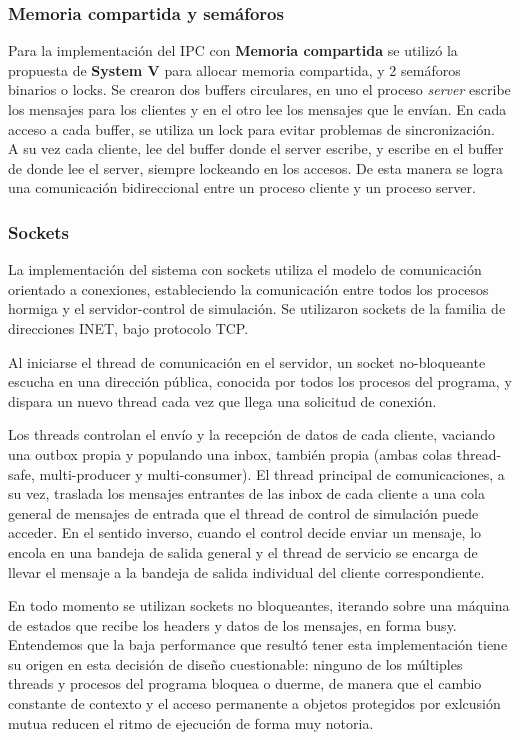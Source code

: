 \documentclass[a4paper,10pt]{article}
\begin{document}
\subsubsection{Memoria compartida y semáforos}
Para la implementación del IPC con \textbf{Memoria compartida} se utilizó la propuesta de \textbf{System V} para allocar memoria compartida, y 
2 semáforos binarios o locks.
Se crearon dos buffers circulares, en uno el proceso \textit{server} escribe los mensajes para los clientes y en el otro lee los mensajes que
le envían. En cada acceso a cada buffer, se utiliza un lock para evitar problemas de sincronización.\\
A su vez cada cliente, lee del buffer donde el server escribe, y escribe en el buffer de donde lee el server, siempre lockeando en los accesos.
De esta manera se logra una comunicación bidireccional entre un proceso cliente y un proceso server.

\subsubsection{Sockets}

La implementación del sistema con sockets utiliza el modelo de comunicación orientado a conexiones, estableciendo la comunicación entre todos los procesos hormiga y el servidor-control de simulación. Se utilizaron sockets de la familia de direcciones INET, bajo protocolo TCP.

Al iniciarse el thread de comunicación en el servidor, un socket no-bloqueante escucha en una dirección pública, conocida por todos los procesos del programa, y dispara un nuevo thread cada vez que llega una solicitud de conexión.

Los threads controlan el envío y la recepción de datos de cada cliente, vaciando una outbox propia y populando una inbox, también propia (ambas colas thread-safe, multi-producer y multi-consumer). El thread principal de comunicaciones, a su vez, traslada los mensajes entrantes de las inbox de cada cliente a una cola general de mensajes de entrada que el thread de control de simulación puede acceder. En el sentido inverso, cuando el control decide enviar un mensaje, lo encola en una bandeja de salida general y el thread de servicio se encarga de llevar el mensaje a la bandeja de salida individual del cliente correspondiente.

En todo momento se utilizan sockets no bloqueantes, iterando sobre una máquina de estados que recibe los headers y datos de los mensajes, en forma busy. Entendemos que la baja performance que resultó tener esta implementación tiene su origen en esta decisión de diseño cuestionable: ninguno de los múltiples threads y procesos del programa bloquea o duerme, de manera que el cambio constante de contexto y el acceso permanente a objetos protegidos por exlcusión mutua reducen el ritmo de ejecución de forma muy notoria.
\end{document}
